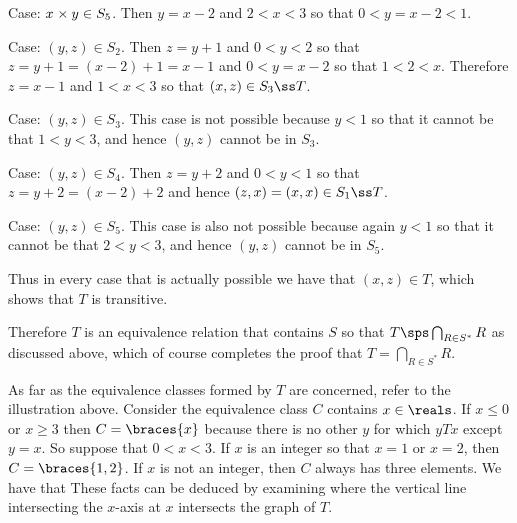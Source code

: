 {{    Case: $x_{} \times y_{} \in S_5$.
    Then $y=x-2$ and $2 < x < 3$ so that $0 < y=x-2 < 1$.
    \begin{indpar}
      Case: $(y,z) \in S_2$.
      Then $z = y+1$ and $0 < y < 2$ so that $z = y+1 = (x-2) + 1 = x-1$ and $0 < y = x-2$ so that $1 < 2 < x$.
      Therefore $z=x-1$ and $1 < x < 3$ so that $(x,z) \in S_3 \ss T$.

      Case: $(y,z) \in S_3$.
      This case is not possible because $y < 1$ so that it cannot be that $1 < y < 3$, and hence $(y,z)$ cannot be in $S_3$.

      Case: $(y,z) \in S_4$.
      Then $z = y+2$ and $0 < y < 1$ so that $z = y+2 = (x-2)+2$ and hence $(z,x) = (x,x) \in S_1 \ss T$.

      Case: $(y,z) \in S_5$.
      This case is also not possible because again $y < 1$ so that it cannot be that $2 < y < 3$, and hence $(y,z)$ cannot be in $S_5$.
    \end{indpar}

    Thus in every case that is actually possible we have that $(x,z) \in T$, which shows that $T$ is transitive.

    Therefore $T$ is an equivalence relation that contains $S$ so that $T \sps \bigcap_{R \in S^*} R$ as discussed above, which of course completes the proof that $T = \bigcap_{R \in S^*} R$.
  }

  As far as the equivalence classes formed by $T$ are concerned, refer to the illustration above.
  Consider the equivalence class $C$ contains $x \in \reals$.
  If $x \leq 0$ or $x \geq 3$ then $C = \braces{x}$ because there is no other $y$ for which $yTx$ except $y=x$.
  So suppose that $0 < x < 3$.
  If $x$ is an integer so that $x = 1$ or $x = 2$, then $C = \braces{1,2}$.
  If $x$ is not an integer, then $C$ always has three elements.
  We have that
  These facts can be deduced by examining where the vertical line intersecting the $x$-axis at $x$ intersects the graph of $T$.
}

